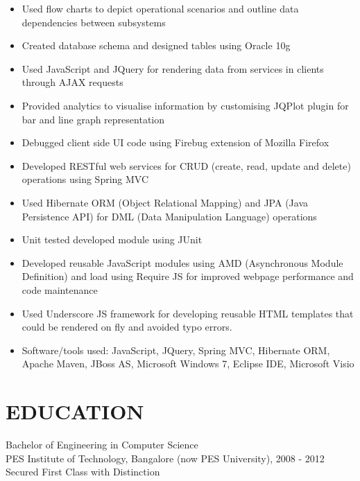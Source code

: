 \documentclass[line, margin]{res}
\begin{document}
\begin{resume}
\begin{itemize}
  \item Used flow charts to depict operational scenarios and outline data dependencies between subsystems
  \item Created database schema and designed tables using Oracle 10g
  \item Used JavaScript and JQuery for rendering data from services in clients through AJAX requests
  \item Provided analytics to visualise information by customising JQPlot plugin for bar and line graph representation
  \item Debugged client side UI code using Firebug extension of Mozilla Firefox
  \item Developed RESTful web services for CRUD (create, read, update and delete) operations using Spring MVC
  \item Used Hibernate ORM (Object Relational Mapping) and JPA (Java Persistence API) for DML (Data Manipulation Language) operations
  \item Unit tested developed module using JUnit
  \item Developed reusable JavaScript modules using AMD (Asynchronous Module Definition) and load using Require JS for improved webpage performance and code maintenance
  \item Used Underscore JS framework for developing reusable HTML templates that could be rendered on fly and avoided typo errors.
    \item Software/tools used: JavaScript, JQuery, Spring MVC, Hibernate ORM, Apache Maven, JBoss AS, Microsoft Windows 7, Eclipse IDE, Microsoft Visio
    \end{itemize}
    \section{EDUCATION}
    Bachelor of Engineering in Computer Science \\
    PES Institute of Technology, Bangalore (now PES University), 2008 - 2012 \\
    Secured First Class with Distinction
\end{resume}
\end{document}
